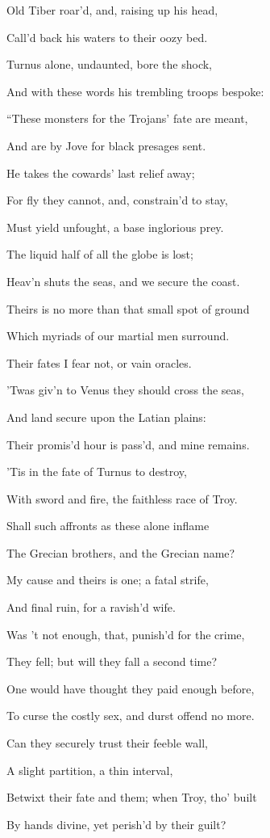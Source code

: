 Old Tiber roar’d, and, raising up his head,

Call’d back his waters to their oozy bed.

Turnus alone, undaunted, bore the shock,

And with these words his trembling troops bespoke:

“These monsters for the Trojans’ fate are meant,

And are by Jove for black presages sent.

He takes the cowards’ last relief away;

For fly they cannot, and, constrain’d to stay,

Must yield unfought, a base inglorious prey.

The liquid half of all the globe is lost;

Heav’n shuts the seas, and we secure the coast.

Theirs is no more than that small spot of ground

Which myriads of our martial men surround.

Their fates I fear not, or vain oracles.

’Twas giv’n to Venus they should cross the seas,

And land secure upon the Latian plains:

Their promis’d hour is pass’d, and mine remains.

’Tis in the fate of Turnus to destroy,

With sword and fire, the faithless race of Troy.

Shall such affronts as these alone inflame

The Grecian brothers, and the Grecian name?

My cause and theirs is one; a fatal strife,

And final ruin, for a ravish’d wife.

Was ’t not enough, that, punish’d for the crime,

They fell; but will they fall a second time?

One would have thought they paid enough before,

To curse the costly sex, and durst offend no more.

Can they securely trust their feeble wall,

A slight partition, a thin interval,

Betwixt their fate and them; when Troy, tho’ built

By hands divine, yet perish’d by their guilt?

